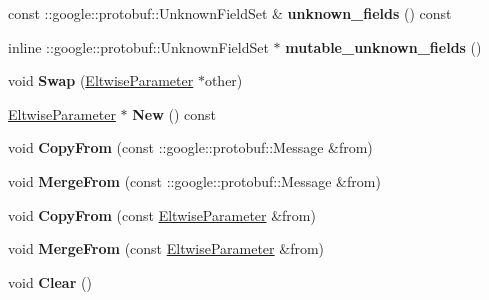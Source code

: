 \begin{DoxyCompactItemize}
const \+::google\+::protobuf\+::\+Unknown\+Field\+Set \& {\bfseries unknown\+\_\+fields} () const
\item 
\mbox{\label{classcaffe_1_1_eltwise_parameter_a42c0eef054e8446734eb549ab85503f0}} 
inline \+::google\+::protobuf\+::\+Unknown\+Field\+Set $\ast$ {\bfseries mutable\+\_\+unknown\+\_\+fields} ()
\item 
\mbox{\label{classcaffe_1_1_eltwise_parameter_afac0d7fde0b1bd17cc1ab11369ced366}} 
void {\bfseries Swap} (\mbox{\hyperlink{classcaffe_1_1_eltwise_parameter}{Eltwise\+Parameter}} $\ast$other)
\item 
\mbox{\label{classcaffe_1_1_eltwise_parameter_acd25914b269211d1100e2cd7fa890502}} 
\mbox{\hyperlink{classcaffe_1_1_eltwise_parameter}{Eltwise\+Parameter}} $\ast$ {\bfseries New} () const
\item 
\mbox{\label{classcaffe_1_1_eltwise_parameter_a966c4d0e26b05f22bb8b07d56007a50b}} 
void {\bfseries Copy\+From} (const \+::google\+::protobuf\+::\+Message \&from)
\item 
\mbox{\label{classcaffe_1_1_eltwise_parameter_a4a52012aba458e7bc828449cef4a24ec}} 
void {\bfseries Merge\+From} (const \+::google\+::protobuf\+::\+Message \&from)
\item 
\mbox{\label{classcaffe_1_1_eltwise_parameter_ad9fce1e756a3ee86ef45a1548e676154}} 
void {\bfseries Copy\+From} (const \mbox{\hyperlink{classcaffe_1_1_eltwise_parameter}{Eltwise\+Parameter}} \&from)
\item 
\mbox{\label{classcaffe_1_1_eltwise_parameter_a5051e2a4266251e87679c0b96f4990e4}} 
void {\bfseries Merge\+From} (const \mbox{\hyperlink{classcaffe_1_1_eltwise_parameter}{Eltwise\+Parameter}} \&from)
\item 
\mbox{\label{classcaffe_1_1_eltwise_parameter_ac8a7a2a57ea863400795f083682fa0d4}} 
void {\bfseries Clear} ()
\item 
\mbox{\label{classcaffe_1_1_eltwise_parameter_a2313e6d3be73d343f3163457d974470e}} 

\end{DoxyCompactItemize}
